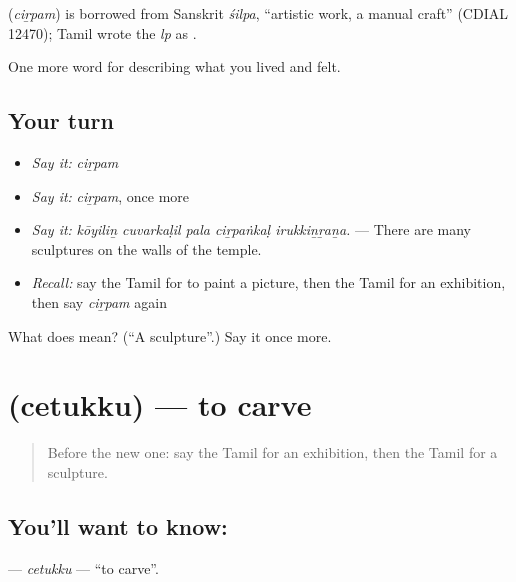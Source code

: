 \begin{cousinweb}
\textbf{} (\emph{ciṟpam}) is borrowed from Sanskrit \emph{śilpa}, \textquotedblleft{}artistic work, a manual craft\textquotedblright{} (CDIAL 12470); Tamil wrote the \emph{lp} as .
\end{cousinweb}

\begin{grammarlens}[title={What you've built}]
One more word for describing what you lived and felt.
\end{grammarlens}

\subsection*{Your turn}
\begin{itemize}
\raggedright
  \item \emph{Say it:} \emph{ciṟpam}
  \item \emph{Say it:} \emph{ciṟpam}, once more
  \item \emph{Say it:} \emph{kōyiliṉ cuvarkaḷil pala ciṟpaṅkaḷ irukkiṉṟaṉa.} — There are many sculptures on the walls of the temple.
  \item \emph{Recall:} say the Tamil for to paint a picture, then the Tamil for an exhibition, then say \emph{ciṟpam} again
\end{itemize}

\begin{tcolorbox}[breakable,colback=teal!4,colframe=teal!35!black,title={Before you move on}]
What does  mean? (\textquotedblleft{}A sculpture\textquotedblright{}.) Say it once more.
\end{tcolorbox}
\section[\texorpdfstring{\ta{செதுக்கு} (cetukku)}{செதுக்கு (cetukku)}]{ (cetukku) — to carve}

\label{lesson:TA-C537-cetukku}



\begin{quote}
Before the new one: say the Tamil for an exhibition, then the Tamil for a sculpture.
\end{quote}

\subsection*{You'll want to know: }
\textbf{} — \emph{cetukku} — \textquotedblleft{}to carve\textquotedblright{}.

